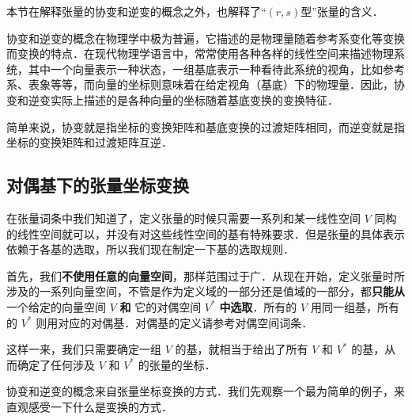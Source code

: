 

本节在解释张量的协变和逆变的概念之外，也解释了“$(r, s)$型”张量的含义．

协变和逆变的概念在物理学中极为普遍，它描述的是物理量随着参考系变化等变换而变换的特点．在现代物理学语言中，常常使用各种各样的线性空间来描述物理系统，其中一个向量表示一种状态，一组基底表示一种看待此系统的视角，比如参考系、表象等等，而向量的坐标则意味着在给定视角（基底）下的物理量．因此，协变和逆变实际上描述的是各种向量的坐标随着基底变换的变换特征．

简单来说，协变就是指坐标的变换矩阵和基底变换的过渡矩阵相同，而逆变就是指坐标的变换矩阵和过渡矩阵互逆．

\subsection{对偶基下的张量坐标变换}

在张量词条中我们知道了，定义张量的时候只需要一系列和某一线性空间 $V$ 同构的线性空间就可以，并没有对这些线性空间的基有特殊要求．但是张量的具体表示依赖于各基的选取，所以我们现在制定一下基的选取规则．

首先，我们\textbf{不使用任意的向量空间}，那样范围过于广．从现在开始，定义张量时所涉及的一系列向量空间，不管是作为定义域的一部分还是值域的一部分，都\textbf{只能从}一个给定的向量空间 $V$ \textbf{和} 它的对偶空间 $V^*$ \textbf{中选取}．所有的 $V$ 用同一组基，所有的 $V^*$ 则用对应的对偶基．对偶基的定义请参考对偶空间词条．

这样一来，我们只需要确定一组 $V$ 的基，就相当于给出了所有 $V$ 和 $V^*$ 的基，从而确定了任何涉及 $V$ 和 $V^*$ 的张量的坐标．



协变和逆变的概念来自张量坐标变换的方式．我们先观察一个最为简单的例子，来直观感受一下什么是变换的方式．


